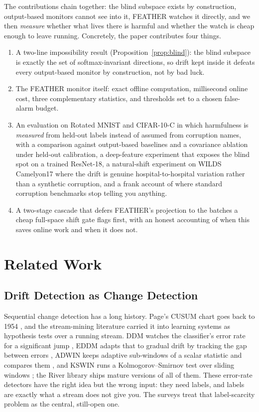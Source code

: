 \documentclass[acmsmall,screen]{acmart}
\theoremstyle{acmdefinition}
\begin{document}
The contributions chain together: the blind subspace exists by construction,
output-based monitors cannot see into it, FEATHER watches it directly, and we
then \emph{measure} whether what lives there is harmful and whether the watch is
cheap enough to leave running. Concretely, the paper contributes four things.
\begin{enumerate}
  \item{A two-line impossibility result
    (Proposition~\ref{prop:blind}): the blind subspace is exactly the set of
    softmax-invariant directions, so drift kept inside it defeats every
    output-based monitor by construction, not by bad luck.}
  \item{The FEATHER monitor itself: exact offline computation, millisecond
    online cost, three complementary statistics, and thresholds set to a
    chosen false-alarm budget.}
  \item{An evaluation on Rotated MNIST and CIFAR-10-C in which harmfulness is
    \emph{measured} from held-out labels instead of assumed from corruption
    names, with a comparison against output-based baselines and a covariance
    ablation under held-out calibration, a deep-feature experiment that
    exposes the blind spot on a trained ResNet-18, a natural-shift experiment
    on WILDS Camelyon17 where the drift is genuine hospital-to-hospital
    variation rather than a synthetic corruption, and a frank account of where
    standard corruption benchmarks stop telling you anything.}
  \item{A two-stage cascade that defers FEATHER's projection to the batches a
    cheap full-space shift gate flags first, with an honest accounting of when
    this saves online work and when it does not.}
\end{enumerate}

\section{Related Work}
\label{sec:related}

\subsection{Drift Detection as Change Detection}

Sequential change detection has a long history. Page's CUSUM chart goes back
to 1954 \cite{page1954cusum}, and the stream-mining literature carried it
into learning systems as hypothesis tests over a running stream. DDM watches
the classifier's error rate for a significant jump \cite{gama2004learning},
EDDM adapts that to gradual drift by tracking the gap between errors
\cite{baena2006eddm}, ADWIN keeps adaptive sub-windows of a scalar statistic
and compares them \cite{bifet2007adwin}, and KSWIN runs a Kolmogorov--Smirnov
test over sliding windows \cite{raab2020kswin}; the River library
\cite{montiel2021river} ships mature versions of all of them. These
error-rate detectors have the right idea but the wrong input: they need
labels, and labels are exactly what a stream does not give you. The surveys
\cite{gama2014survey, lu2018learning} treat that label-scarcity problem as
the central, still-open one.
\end{document}
